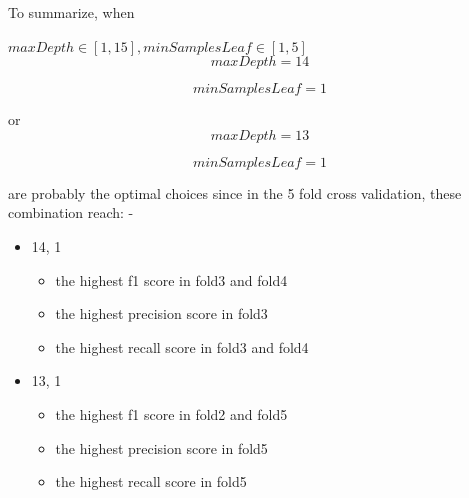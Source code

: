 \documentclass[11pt]{article}
\begin{document}
    To summarize, when
    
    \(maxDepth \in [1,15], minSamplesLeaf \in [1,5]\)
\[maxDepth= 14\]

\[minSamplesLeaf = 1\]

or
\[maxDepth= 13\]

\[minSamplesLeaf = 1\]

are probably the optimal choices since in the 5 fold cross validation,
these combination reach: -
\begin{itemize}
	\item  14, 1
	\begin{itemize}
		 \item the highest f1 score in fold3 and
		fold4 
		\item the highest precision score in fold3 
		\item the highest recall score
		in fold3 and fold4 
	\end{itemize}
\end{itemize}
\begin{itemize}
	\item 13, 1
	\begin{itemize}
		\item the highest f1 score in fold2 and fold5 
		\item the highest precision score in fold5 
		\item the highest recall score in fold5		
	\end{itemize}
\end{itemize}
 
    
    
    
    
\end{document}
